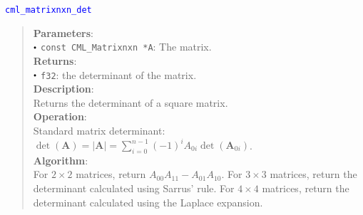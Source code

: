 \documentclass[a4paper,oneside,8pt]{extarticle}
\newcommand{\function}[1]{
  \noindent\textcolor{blue}{\texttt{#1}}
  \vspace{-0.3em}
}
\renewcommand{\dot}{\raisebox{0.3ex}{\scalebox{0.6}{$\bullet$}}}
\theoremstyle{definition}
\begin{document}
\function{cml\_matrixnxn\_det}
\begin{quote}
  \textbf{Parameters}: \\
  $\dot$ \texttt{const CML\_Matrixnxn *A}: The matrix. \\
  \textbf{Returns}: \\
  $\dot$ \texttt{f32}: the determinant of the matrix. \\

  \vspace{-0.75em}
  \textbf{Description}: \\
  Returns the determinant of a square matrix. \\

  \vspace{-0.75em}
  \textbf{Operation}: \\
  Standard matrix determinant: $\det(\mathbf{A}) = \lvert\mathbf{A}\rvert = \sum_{i=0}^{n-1} (-1)^iA_{0i}\det(\mathbf{A}_{0i})$. \\

  \vspace{-0.75em}
  \textbf{Algorithm}: \\
  For $2\times 2$ matrices, return $A_{00}A_{11} - A_{01}A_{10}$. For $3\times 3$ matrices, return the determinant calculated using Sarrus' rule. For $4\times 4$ matrices, return the determinant calculated using the Laplace expansion. \\
\end{quote}
\end{document}
